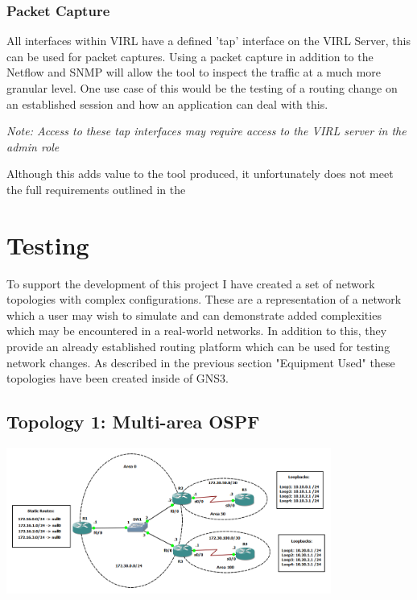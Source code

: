 \documentclass[11pt]{report}
\begin{document}
\subsection{Packet Capture}

All interfaces within VIRL have a defined 'tap' interface on the VIRL Server, this can be used for packet captures. Using a packet capture in addition to the Netflow and SNMP will allow the tool to inspect the traffic at a much more granular level. One use case of this would be the testing of a routing change on an established session and how an application can deal with this.

\textit{Note: Access to these tap interfaces may require access to the VIRL server in the admin role}

Although this adds value to the tool produced, it unfortunately does not meet the full requirements outlined in the  

\chapter{Testing}

To support the development of this project I have created a set of network topologies with complex configurations. These are a representation of a network which a user may wish to simulate and can demonstrate added complexities which may be encountered in a real-world networks. In addition to this, they provide an already established routing platform which can be used for testing network changes. As described in the previous section "Equipment Used" these topologies have been created inside of GNS3.

\section{Topology 1: Multi-area OSPF}

\begin{center}
\includegraphics[width=0.8\textwidth]{OSPF-Topology.png}
\end{center}
\end{document}
